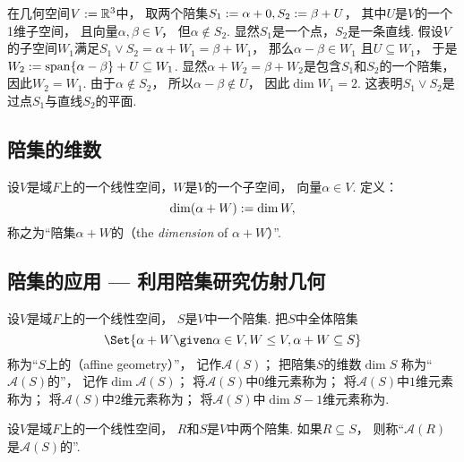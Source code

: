 \begin{example}
在几何空间\(V := \mathbb{R}^3\)中，
取两个陪集\(
	S_1 := \alpha + 0,
	S_2 := \beta + U
\)，
其中\(U\)是\(V\)的一个1维子空间，
且向量\(\alpha,\beta \in V\)，
但\(\alpha \notin S_2\).
显然\(S_1\)是一个点，\(S_2\)是一条直线.
假设\(V\)的子空间\(W_1\)满足\(
	S_1 \vee S_2
	= \alpha + W_1
	= \beta + W_1
\)，
那么\(\alpha - \beta \in W_1\)
且\(U \subseteq W_1\)，
于是\(
	W_2
	\allowbreak
	:= \operatorname{span}\{\alpha - \beta\} + U
	\allowbreak
	\subseteq W_1
\).
显然\(\alpha + W_2 = \beta + W_2\)是包含\(S_1\)和\(S_2\)的一个陪集，
因此\(W_2 = W_1\).
由于\(\alpha \notin S_2\)，
所以\(\alpha - \beta \notin U\)，
因此\(\dim W_1 = 2\).
这表明\(S_1 \vee S_2\)是过点\(S_1\)与直线\(S_2\)的平面.
\end{example}

\subsection{陪集的维数}
\begin{definition}
设\(V\)是域\(F\)上的一个线性空间，\(W\)是\(V\)的一个子空间，
向量\(\alpha \in V\).
定义：\begin{equation}
	\dim(\alpha + W)
	:=
	\dim W,
\end{equation}
称之为“陪集\(\alpha + W\)的（the \emph{dimension} of \(\alpha + W\)）”.
\end{definition}

\subsection{陪集的应用 --- 利用陪集研究仿射几何}
\begin{definition}
设\(V\)是域\(F\)上的一个线性空间，
\(S\)是\(V\)中一个陪集.
把\(S\)中全体陪集\begin{equation*}
	\Set{
		\alpha + W
		\given
		\alpha \in V,
		W \leq V,
		\alpha + W \subseteq S
	}
\end{equation*}
称为“\(S\)上的（affine geometry）”，
记作\(\mathcal{A}(S)\)；
把陪集\(S\)的维数\(\dim S\)
称为“\(\mathcal{A}(S)\)的”，
记作\(\dim\mathcal{A}(S)\)；
将\(\mathcal{A}(S)\)中\(0\)维元素称为；
将\(\mathcal{A}(S)\)中\(1\)维元素称为；
将\(\mathcal{A}(S)\)中\(2\)维元素称为；
将\(\mathcal{A}(S)\)中\(\dim S-1\)维元素称为.
\end{definition}

\begin{definition}
设\(V\)是域\(F\)上的一个线性空间，
\(R\)和\(S\)是\(V\)中两个陪集.
如果\(R \subseteq S\)，
则称“\(\mathcal{A}(R)\)是\(\mathcal{A}(S)\)的”.
\end{definition}

